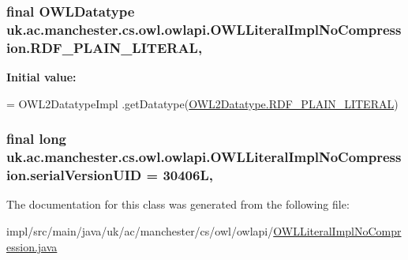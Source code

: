 \hypertarget{classuk_1_1ac_1_1manchester_1_1cs_1_1owl_1_1owlapi_1_1_o_w_l_literal_impl_no_compression_a62a64938690e4ed89e2895484183f1ff}{
\subsubsection[{R\-D\-F\-\_\-\-P\-L\-A\-I\-N\-\_\-\-L\-I\-T\-E\-R\-A\-L}]{\setlength{\rightskip}{0pt plus 5cm}final {\bf O\-W\-L\-Datatype} uk.\-ac.\-manchester.\-cs.\-owl.\-owlapi.\-O\-W\-L\-Literal\-Impl\-No\-Compression.\-R\-D\-F\-\_\-\-P\-L\-A\-I\-N\-\_\-\-L\-I\-T\-E\-R\-A\-L\hspace{0.3cm}{\ttfamily [static]}, {\ttfamily [private]}}}\label{classuk_1_1ac_1_1manchester_1_1cs_1_1owl_1_1owlapi_1_1_o_w_l_literal_impl_no_compression_a62a64938690e4ed89e2895484183f1ff}
{\bfseries Initial value\-:}
\begin{DoxyCode}
= OWL2DatatypeImpl
            .getDatatype(\hyperlink{enumorg_1_1semanticweb_1_1owlapi_1_1vocab_1_1_o_w_l2_datatype_a9c2f197109cd73dfe3f0f251854db4c9}{OWL2Datatype.RDF\_PLAIN\_LITERAL})
\end{DoxyCode}
\hypertarget{classuk_1_1ac_1_1manchester_1_1cs_1_1owl_1_1owlapi_1_1_o_w_l_literal_impl_no_compression_addc159e63559d2d4163ccd974b339be9}{
\subsubsection[{serial\-Version\-U\-I\-D}]{\setlength{\rightskip}{0pt plus 5cm}final long uk.\-ac.\-manchester.\-cs.\-owl.\-owlapi.\-O\-W\-L\-Literal\-Impl\-No\-Compression.\-serial\-Version\-U\-I\-D = 30406\-L\hspace{0.3cm}{\ttfamily [static]}, {\ttfamily [private]}}}\label{classuk_1_1ac_1_1manchester_1_1cs_1_1owl_1_1owlapi_1_1_o_w_l_literal_impl_no_compression_addc159e63559d2d4163ccd974b339be9}


The documentation for this class was generated from the following file\-:\begin{DoxyCompactItemize}
\item 
impl/src/main/java/uk/ac/manchester/cs/owl/owlapi/\hyperlink{_o_w_l_literal_impl_no_compression_8java}{O\-W\-L\-Literal\-Impl\-No\-Compression.\-java}\end{DoxyCompactItemize}
